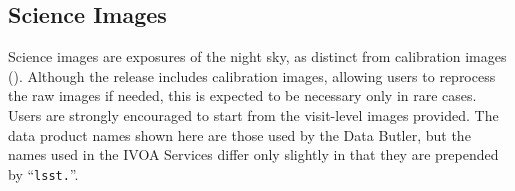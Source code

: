 


%

% 

%



\subsection{Science Images
\label{ssec:science_images}}
Science images are exposures of the night sky, as distinct from \gls{calibration} images ().
Although the release includes \gls{calibration} images, allowing users to reprocess the raw images if needed, this is expected to be necessary only in rare cases.
Users are strongly encouraged to start from the visit-level images provided.
The data product names shown here are those used by the Data \gls{Butler}, but the names used in the \gls{IVOA} Services differ only slightly in that they are prepended by ``\texttt{lsst.}''.


